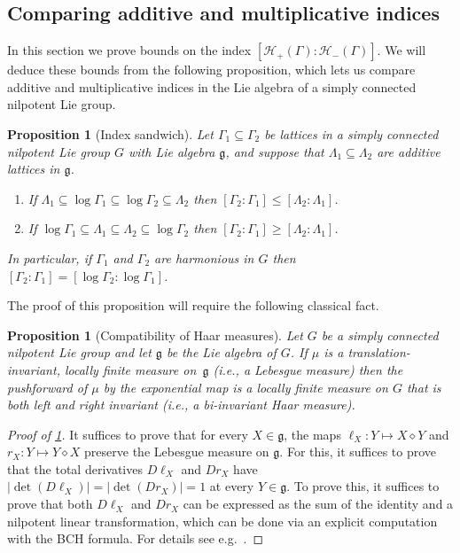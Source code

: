 \documentclass[11pt]{article}
\numberwithin{equation}{section}
\theoremstyle{plain}
\newtheorem{proposition}[thm]{Proposition}
\theoremstyle{definition}
\theoremstyle{remark}
\numberwithin{equation}{section}
\numberwithin{equation}{section}
\begin{document}
%
%
%

%
%
%

\subsection{Comparing additive and multiplicative indices}

In this section we prove bounds on the index $[\mathscr{H}_+(\Gamma):\mathscr{H}_-(\Gamma)]$. We will deduce these bounds from the following proposition, which lets us compare additive and multiplicative indices in the Lie algebra of a simply connected nilpotent Lie group.


\begin{proposition}[Index sandwich]
\label{prop:harmonious_indices}
Let $\Gamma_1 \subseteq \Gamma_2$ be lattices in a simply connected nilpotent Lie group $G$ with Lie algebra $\mathfrak{g}$, and suppose that $\Lambda_1\subseteq \Lambda_2$ are additive lattices in $\mathfrak{g}$.
\begin{enumerate}
\item If $\Lambda_1 \subseteq \log \Gamma_1 \subseteq \log \Gamma_2 \subseteq \Lambda_2$ then $[\Gamma_2:\Gamma_1] \leq [\Lambda_2:\Lambda_1]$. 
\item If  $\log \Gamma_1 \subseteq \Lambda_1  \subseteq \Lambda_2 \subseteq \log \Gamma_2$ then $[\Gamma_2:\Gamma_1] \geq [\Lambda_2:\Lambda_1]$. 
\end{enumerate}
In particular, if $\Gamma_1$ and $\Gamma_2$ are harmonious in $G$ then $[\Gamma_2:\Gamma_1]=[\log \Gamma_2:\log \Gamma_1]$.
\end{proposition}

The proof of this proposition will require the following classical fact.

\begin{proposition}[Compatibility of Haar measures]
\label{prop:Haar_to_Lebesgue}
Let $G$ be a simply connected nilpotent Lie group and let $\mathfrak{g}$ be the Lie algebra of $G$. If $\mu$ is a translation-invariant, locally finite measure on~$\mathfrak{g}$ (i.e., a Lebesgue measure) then the pushforward of $\mu$ by the exponential map is a locally finite measure on $G$ that is both left and right invariant (i.e., a bi-invariant Haar measure).
\end{proposition}

\begin{proof}[Proof of \cref{prop:Haar_to_Lebesgue}]
It suffices to prove that for every $X\in \mathfrak{g}$, the maps $\ell_X:Y \mapsto X \diamond Y$ and $r_X:Y \mapsto Y \diamond X$ preserve the Lebesgue measure on $\mathfrak{g}$. For this, it suffices to prove that the total derivatives $D\ell_X$ and $Dr_X$ have $|\det(D\ell_X)|=|\det(Dr_X)|=1$ at every $Y\in \mathfrak{g}$. To prove this, it suffices to prove that both $D\ell_X$ and $Dr_X$ can be expressed as the sum of the identity and a nilpotent linear transformation, which can be done via an explicit computation with the BCH formula. For details see e.g.\ \cite[Proposition 2.1.1]{Wang2023}.
\end{proof}
\end{document}
